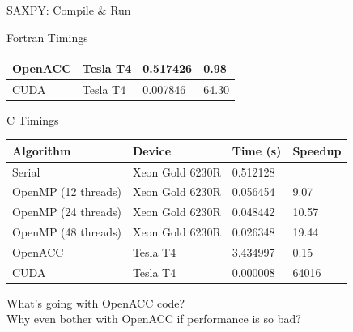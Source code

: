 \documentclass[10pt,t]{beamer}
\begin{document}
\begin{frame}{SAXPY: Compile \& Run}
\begin{exampleblock}{Fortran Timings}
{\begin{center}
\begin{tabular}{|bbbb|}
         \hline
         OpenACC & Tesla T4 & 0.517426 & 0.98  \\ %
         \hline
         CUDA & Tesla T4 & 0.007846 & 64.30 \\
        \hline
      \end{tabular}
    \end{center}
    }
  \end{exampleblock}
  \begin{exampleblock}{C Timings}
    {\scriptsize
    \begin{center}
      \begin{tabular}{|bbbb|}
        \hline
        \rowcolor{lublue}Algorithm & Device & Time (s) & Speedup \\
        \hline
         Serial & Xeon Gold 6230R & 0.512128 & \\
         \hline
         OpenMP (12 threads) & Xeon Gold 6230R & 0.056454 &  9.07 \\
         OpenMP (24 threads) & Xeon Gold 6230R & 0.048442 & 10.57 \\
         OpenMP (48 threads) & Xeon Gold 6230R & 0.026348 & 19.44 \\
         \hline
         OpenACC & Tesla T4 & 3.434997 & 0.15 \\ %
         \hline
         CUDA & Tesla T4 & 0.000008 & 64016 \\
        \hline
      \end{tabular}
    \end{center}
    }
  \end{exampleblock}
  What's going with OpenACC code? \\
  Why even bother with OpenACC if performance is so bad?
 \end{frame}
\end{document}
